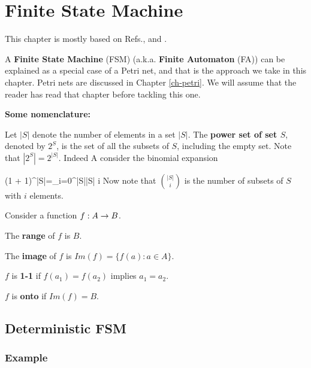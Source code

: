 \chapter{Finite State Machine}
\label{ch-finite-state}

This chapter is mostly based on Refs.\cite{fsm-brilliant}, \cite{wiki-det-automaton} and
\cite{wiki-nondet-automaton}.

A {\bf Finite State Machine} (FSM) (a.k.a. {\bf Finite Automaton} (FA))  can be explained as a 
special case of a Petri net, and that
is the approach we take in this chapter.
Petri nets are discussed in Chapter \ref{ch-petri}. We will assume
that the reader has read that chapter before tackling this one.

{\bf Some nomenclature:}

Let $|S|$ denote the number of elements
in a set $|S|$.
The {\bf power set of set $S$}, denoted by $2^S$,
is the set of all the subsets of $S$, including the empty set.
Note that $|2^S|=2^{|S|}$. Indeed
A consider the binomial expansion

\beq
(1 + 1)^{|S|}=\sum_{i=0}^{|S|}{|S| \choose i}
\eeq
Now note that  ${|S|\choose i}$
is the number of subsets of $S$ with $i$ elements.

Consider a function
$f:A\rightarrow B$. 

The {\bf range} of $f$ is $B$.

The {\bf image} of $f$
is $Im(f)=\{f(a): a\in A\}$. 

$f$ is {\bf 1-1} if $f(a_1)=f(a_2)$
implies $a_1=a_2$.


$f$ is {\bf onto} if $Im(f)=B$.

\section{Deterministic FSM}

\subsection{Example}

